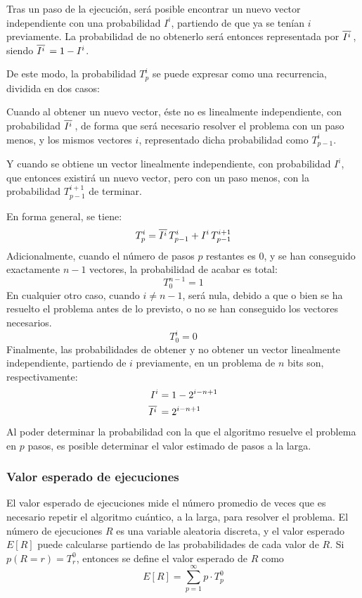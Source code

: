 Tras un paso de la ejecución, será posible encontrar un nuevo vector 
independiente con una probabilidad $I^i$, partiendo de que ya se tenían $i$ 
previamente. La probabilidad de no obtenerlo será entonces representada por $\overline{I^{i}}\,$, siendo $\overline{I^{i}}\, = 1 - I^i$.

De este modo, la probabilidad $T^i_p$ se puede expresar como una recurrencia, 
dividida en dos casos:

Cuando al obtener un nuevo vector, éste no es linealmente independiente, con 
probabilidad $\overline{I^{i}}\,$, de forma que será necesario resolver el problema con un 
paso menos, y los mismos vectores $i$, representado dicha probabilidad como 
$T^i_{p-1}$.

Y cuando se obtiene un vector linealmente independiente, con probabilidad $I^i$, 
que entonces existirá un nuevo vector, pero con un paso menos, con la 
probabilidad $T^{i+1}_{p-1}$ de terminar.

En forma general, se tiene:
%
\begin{equation}
	\label{eq:rec_T}
	T^i_p = \overline{I^{i}}\, T^i_{p-1} + I^i \, T^{i+1}_{p-1}
\end{equation}
%
Adicionalmente, cuando el número de pasos $p$ restantes es 0, y se han 
conseguido exactamente $n-1$ vectores, la probabilidad de acabar es total:
%
$$ T^{n-1}_0 = 1 $$
%
En cualquier otro caso, cuando $i \neq n-1$, será nula, debido a que o bien se 
ha resuelto el problema antes de lo previsto, o no se han conseguido los 
vectores necesarios.
%
$$ T^i_0 = 0 $$
%
Finalmente, las probabilidades de obtener y no obtener un vector linealmente 
independiente, partiendo de $i$ previamente, en un problema de $n$ bits son, 
respectivamente:
\begin{equation}
\begin{split}
	I^i & = 1 - 2^{i-n+1}
\\
	\overline{I^{i}}\, & = 2^{i-n+1}
\end{split}
\end{equation}
%
Al poder determinar la probabilidad con la que el algoritmo resuelve el problema 
en $p$ pasos, es posible determinar el valor estimado de pasos a la larga.

\subsubsection{Valor esperado de ejecuciones}
%
El valor esperado de ejecuciones mide el número promedio de veces que es 
necesario repetir el algoritmo cuántico, a la larga, para resolver el problema.  
El número de ejecuciones $R$ es una variable aleatoria discreta, y el valor 
esperado $E[R]$ puede calcularse partiendo de las probabilidades de cada valor 
de $R$. Si $p(R=r) = T^0_r$, entonces se define el valor esperado de $R$ como
%
\begin{equation}
	E[R] = \sum^{\infty}_{p=1} p \cdot T^0_p
\end{equation}
%
